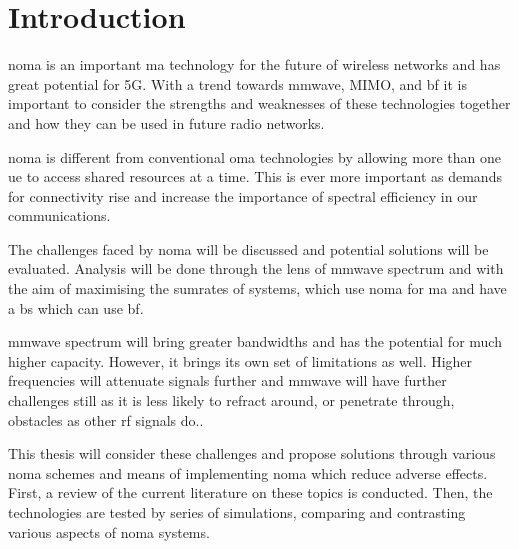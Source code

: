 \chapter{Introduction}
\ac{noma} is an important \ac{ma} technology for the future of wireless networks and has great potential for 5G.
With a trend towards \ac{mmwave}, MIMO, and \ac{bf} it is important to consider the strengths and weaknesses of these technologies together and how they can be used in future radio networks.

\par
\ac{noma} is different from conventional \ac{oma} technologies by allowing more than one \ac{ue} to access shared resources at a time.
This is ever more important as demands for connectivity rise and increase the importance of spectral efficiency in our communications.

\par
The challenges faced by \ac{noma} will be discussed and potential solutions will be evaluated.
Analysis will be done through the lens of \ac{mmwave} spectrum and with the aim of maximising the sumrates of systems, which use \ac{noma} for \ac{ma} and have a \ac{bs} which can use \ac{bf}.

\par
\ac{mmwave} spectrum will bring greater bandwidths and has the potential for much higher capacity.
However, it brings its own set of limitations as well.
Higher frequencies will attenuate signals further and \ac{mmwave} will have further challenges still as it is less likely to refract around, or penetrate through, obstacles as other \ac{rf} signals do..

\par
This thesis will consider these challenges and propose solutions through various \ac{noma} schemes and means of implementing \ac{noma} which reduce adverse effects.
First, a review of the current literature on these topics is conducted.
Then, the technologies are tested by series of simulations, comparing and contrasting various aspects of \ac{noma} systems.

\iffalse
This thesis will evaluate the current state of \ac{noma} and related technologies.
We will also explore the work undertaken in and related to \ac{noma} simulations to date.
Finally, we will consider the work required to complete this project.
\fi

